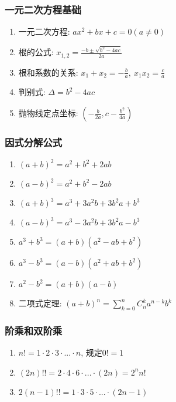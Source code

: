 \subsubsection{一元二次方程基础}
\begin{enumerate}
    \item 一元二次方程: $ ax^{2}+bx+c=0(a\neq 0) $
    \item 根的公式: $ x_{1,2}=\frac{-b\pm \sqrt{b^{2}-4ac}}{2a} $
    \item 根和系数的关系: $ x_{1}+x_{2}=-\frac{b}{a},\ x_{1}x_{2}=\frac{c}{a} $
    \item 判别式: $ \Delta=b^{2}-4ac $
    \item 抛物线定点坐标: $ (-\frac{b}{2a},c-\frac{b^{2}}{4a}) $
\end{enumerate}
\subsubsection{因式分解公式}
\begin{enumerate}
    \item $ (a+b)^{2}=a^{2}+b^{2}+2ab $
    \item $ (a-b)^{2}=a^{2}+b^{2}-2ab $
    \item $ (a+b)^{3}=a^{3}+3a^{2}b+3b^{2}a+b^{3} $
    \item $ (a-b)^{3}=a^{3}-3a^{2}b+3b^{2}a-b^{3} $
    \item $ a^{3}+b^{3}=(a+b)(a^{2}-ab+b^{2}) $
    \item $ a^{3}-b^{3}=(a-b)(a^{2}+ab+b^{2}) $
    \item $ a^{2}-b^{2}=(a+b)(a-b) $
    \item 二项式定理: $ (a+b)^{n}=\sum_{k=0}^{n}C_{n}^{k}a^{n-k}b^{k} $
\end{enumerate}
\subsubsection{阶乘和双阶乘}
\begin{enumerate}
    \item $ n!=1\cdot 2\cdot 3\cdot ... \cdot n $, 规定$ 0!=1 $
    \item $ (2n)!!=2\cdot 4\cdot 6\cdot ... \cdot (2n)=2^{n}n! $
    \item $ 2(n-1)!!=1\cdot 3\cdot 5\cdot ... \cdot (2n-1) $
\end{enumerate}
